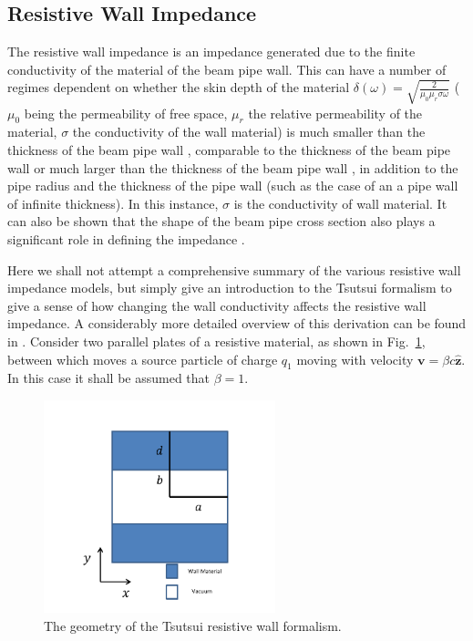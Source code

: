 \subsection{Resistive Wall Impedance}
\label{sec:res_wall_imp}

The resistive wall impedance is an impedance generated due to the finite conductivity of the material of the beam pipe wall. This can have a number of regimes dependent on whether the skin depth of the material $\delta \left( \omega \right) = \sqrt{\frac{2}{\mu_{0} \mu_{r} \sigma \omega}}$ ($\mu_{0}$ being the permeability of free space, $\mu_{r}$ the relative permeability of the material, $\sigma$ the conductivity of the wall material) is much smaller than the thickness of the beam pipe wall \cite{Chao:PhysColEff}, comparable to the thickness of the beam pipe wall \cite{Roncarolo:ColImpMeas, Metral:ResWallWideFreq} or much larger than the thickness of the beam pipe wall \cite{Tsutsui:ferrKickLong, Biancacci:MMFiniteInsert}, in addition to the pipe radius and the thickness of the pipe wall (such as the case of an a pipe wall of infinite thickness). In this instance, $\sigma$ is the conductivity of wall material. It can also be shown that the shape of the beam pipe cross section also plays a significant role in defining the impedance \cite{Mounet:Axisymmetric, Mounet:Flat}.

Here we shall not attempt a comprehensive summary of the various resistive wall impedance models, but simply give an introduction to the Tsutsui formalism to give a sense of how changing the wall conductivity affects the resistive wall impedance. A considerably more detailed overview of this derivation can be found in \cite{Tsutsui:ferrKickLong, Tsutsui:DipoleKicker}. Consider two parallel plates of a resistive material, as shown in Fig.~\ref{fig:res_wall_diagram}, between which moves a source particle of charge $q_{1}$ moving with velocity $\mathbf{v} = \beta c \mathbf{\hat{z}}$. In this case it shall be assumed that $\beta = 1$.

\begin{figure}
\begin{center}
\includegraphics[width=0.6\textwidth]{Wakefields_and_Impedances/figures/reWallGeo.pdf}
\end{center}
\caption{The geometry of the Tsutsui resistive wall formalism.}
\label{fig:res_wall_diagram}
\end{figure}

